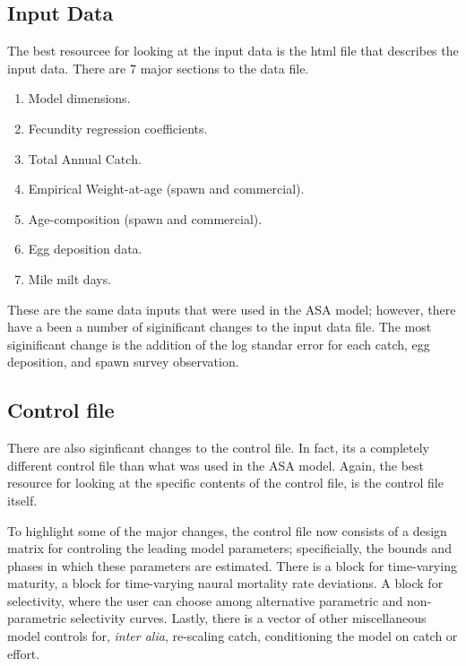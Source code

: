 \documentclass[12pt,letterpaper]{article}
\begin{document}
  \subsection{Input Data} %
  \label{sub:input_data}
    The best resourcee for looking at the input data is the html file that describes the input data. There are 7 major sections to the data file.
    \begin{enumerate}
      \item Model dimensions.
      \item Fecundity regression coefficients.
      \item Total Annual Catch.
      \item Empirical Weight-at-age (spawn and commercial).
      \item Age-composition (spawn and commercial).
      \item Egg deposition data.
      \item Mile milt days.
    \end{enumerate}

    These are the same data inputs that were used in the ASA model; however, there have a been a number of siginificant changes to the input data file.  The most siginificant change is the addition of the log standar error for each catch, egg deposition, and spawn survey observation.  

  \subsection{Control file} %
  \label{sub:control_file}
    There are also siginficant changes to the control file.  In fact, its a completely different control file than what was used in the ASA model.  Again, the best resource for looking at the specific contents of the control file, is the control file itself. 

    To highlight some of the major changes, the control file now consists of a design matrix for controling the leading model parameters; specificially, the bounds and phases in which these parameters are estimated.  There is a block for time-varying maturity, a block for time-varying naural mortality rate deviations.  A block for selectivity, where the user can choose among alternative parametric and non-parametric selectivity curves. Lastly, there is a vector of other miscellaneous model controls for, \textit{inter alia}, re-scaling catch, conditioning the model on catch or effort.  
\end{document}
